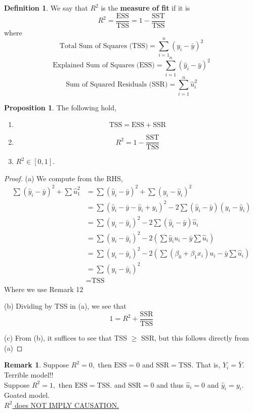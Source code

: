 \documentclass[10pt, oneside]{article}
\theoremstyle{definition}
\newtheorem{defn}{Definition}
\newtheorem{prop}{Proposition}
\newtheorem{rem}{Remark}
\begin{document}
\begin{defn}
    We say that $R^2$ is the \textbf{measure of fit} if it is 
    \[R^2 = \frac{\text{ESS}}{\text{TSS}} = 1 - \frac{\text{SST}}{\text{TSS}}\] where 
    \[\text{Total Sum of Squares (TSS)} = \sum_{i=1}^n (y_i - \bar y)^2\]
    \[\text{Explained Sum of Squares (ESS)} = \sum_{i=1}^n (\hat y_i - \bar y)^2\]
    \[\text{Sum of Squared Residuals (SSR)} = \sum_{i=1}^n \hat{u}_i^2\]
\end{defn}
\begin{prop}
The following hold, 
\begin{enumerate}
    \item \[\text{TSS} = \text{ESS} + \text{SSR}\]
    \item \[R^2 =  1 - \frac{\text{SST}}{\text{TSS}}\]
    \item $R^2 \in [0,1].$
\end{enumerate}
\end{prop}
\begin{proof}
    (a) We compute from the RHS,
    \begin{align*}
        \sum (\hat{y}_i - \bar y)^2  + \sum \hat u_1^2 &= \sum (\hat{y}_i - \bar y)^2  + \sum (y_i- \hat y_i)^2\\
        &= \sum (\hat{y}_i - \bar y - \hat y_i + y_i)^2   - 2\sum (\hat y_i - \bar y)(y_i - \hat y_i)\\
        &= \sum (y_i - \bar y_i)^2 - 2\sum (\hat y_i - \bar y)\hat u_i\\
        &= \sum (y_i - \bar y_i)^2 - 2(\sum \hat y_i u_i - \bar y\sum\hat u_i)\\
        &= \sum (y_i - \bar y_i)^2 - 2(\sum (\beta_0 + \beta_1 x_i) u_i - \bar y\sum\hat u_i)\\
        &= \sum (y_i - \bar y_i)^2\\
        &= \text{TSS}
    \end{align*}
    Where we use Remark 12

    (b) Dividing by TSS in (a), we see that 
    \[1 = R^2 + \frac{\text{SSR}}{\text{TSS}}\]

    (c) From (b), it suffices to see that TSS $\geq$ SSR, but this follows directly from (a)
\end{proof}




\begin{rem}
    Suppose $R^2  = 0,$ then $\text{ESS} = 0$ and $\text{SSR}  = \text{TSS}.$ That is, $\hat{Y}_i = \bar Y.$ Terrible model!!\\

    Suppose $R^2 = 1,$ then $\text{ESS}  = \text{TSS}.$ and $\text{SSR}  =0$ and thus $\hat{u}_i = 0$ and $\hat{y}_i = y_i.$ Goated model.\\

    \underline{$R^2$ does NOT IMPLY CAUSATION.}
\end{rem}
\end{document}
